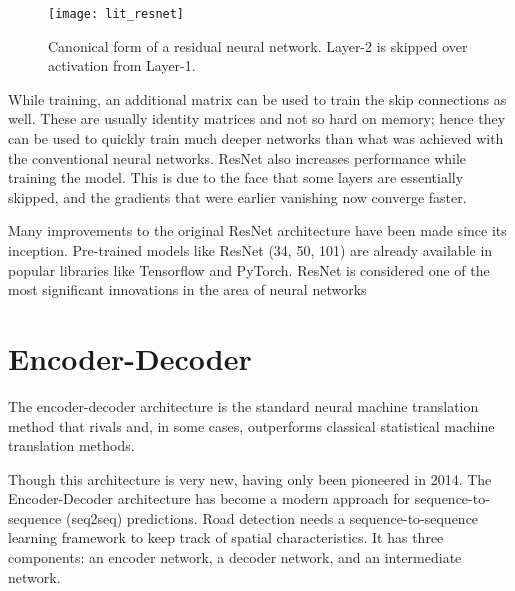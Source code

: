 \begin{figure}[h!]
    \centering
    \texttt{[image: lit\_resnet]}
    \caption[A residual network]{Canonical form of a residual neural network. Layer-2 is skipped over activation from Layer-1.}
    \label{fig:residual_network}
\end{figure}

While training, an additional matrix can be used to train the skip connections as well. These are usually identity matrices and not so hard on memory; hence they can be used to quickly train much deeper networks than what was achieved with the conventional neural networks. ResNet also increases performance while training the model. This is due to the face that some layers are essentially skipped, and the gradients that were earlier vanishing now converge faster.

Many improvements to the original ResNet architecture have been made since its inception. Pre-trained models like ResNet (34, 50, 101) are already available in popular libraries like Tensorflow and PyTorch. ResNet is considered one of the most significant innovations in the area of neural networks

\section{Encoder-Decoder}
The encoder-decoder architecture is the standard neural machine translation method that rivals and, in some cases, outperforms classical statistical machine translation methods.

Though this architecture is very new, having only been pioneered in 2014. The Encoder-Decoder architecture has become a modern approach for sequence-to-sequence (seq2seq) predictions. Road detection needs a sequence-to-sequence learning framework to keep track of spatial characteristics. It has three components: an encoder network, a decoder network, and an intermediate network.






